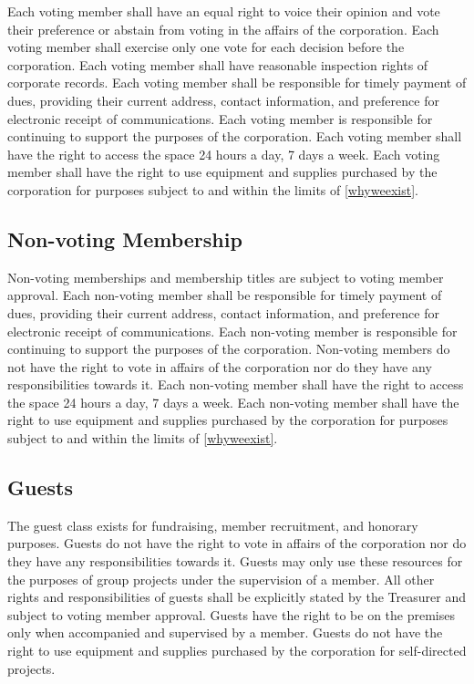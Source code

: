 \documentclass[10pt,letterpaper,titlepage]{article}
\begin{document}
Each voting member shall have an equal right to voice their opinion and vote
their preference or abstain from voting in the affairs of the corporation.
Each voting member shall exercise only one vote for each decision before the
corporation.
Each voting member shall have reasonable inspection rights of corporate
records.
Each voting member shall be responsible for timely payment of dues, providing
their current address, contact information, and preference for electronic
receipt of communications.
Each voting member is responsible for continuing to support the purposes of the
corporation.
Each voting member shall have the right to access the space 24 hours a day, 7
days a week.
Each voting member shall have the right to use equipment and supplies purchased
by the corporation for purposes subject to and within the limits of
\ref{whyweexist}.

\subsection{Non-voting Membership}
Non-voting memberships and membership titles are subject to voting member
approval.
Each non-voting member shall be responsible for timely payment of dues, providing
their current address, contact information, and preference for electronic
receipt of communications.
Each non-voting member is responsible for continuing to support the purposes of the
corporation.
Non-voting members do not have the right to vote in affairs of the corporation
nor do they have any responsibilities towards it.
Each non-voting member shall have the right to access the space 24 hours a day, 7
days a week.
Each non-voting member shall have the right to use equipment and supplies purchased
by the corporation for purposes subject to and within the limits of
\ref{whyweexist}.

\subsection{Guests}
The guest class exists for fundraising, member recruitment,
and honorary purposes.
Guests do not have the right to vote in affairs of the corporation
nor do they have any responsibilities towards it.
Guests may only use these resources for the purposes of group
projects under the supervision of a member.
All other rights and responsibilities of guests shall be explicitly
stated by the Treasurer and subject to voting member approval.
Guests have the right to be on the premises only when accompanied
and supervised by a member.
Guests do not have the right to use equipment and supplies
purchased by the corporation for self-directed projects.
\end{document}
